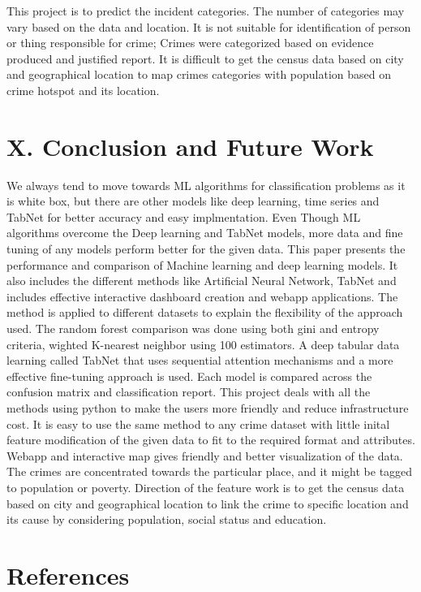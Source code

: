 \documentclass[10 pt,conference,final,]{IEEEtran}
\begin{document}
This project is to predict the incident categories. The number of
categories may vary based on the data and location. It is not suitable
for identification of person or thing responsible for crime; Crimes were
categorized based on evidence produced and justified report. It is
difficult to get the census data based on city and geographical location
to map crimes categories with population based on crime hotspot and its
location.

\section{X. Conclusion and Future
Work}\label{x.-conclusion-and-future-work}

We always tend to move towards ML algorithms for classification problems
as it is white box, but there are other models like deep learning, time
series and TabNet for better accuracy and easy implmentation. Even
Though ML algorithms overcome the Deep learning and TabNet models, more
data and fine tuning of any models perform better for the given data.
This paper presents the performance and comparison of Machine learning
and deep learning models. It also includes the different methods like
Artificial Neural Network, TabNet and includes effective interactive
dashboard creation and webapp applications. The method is applied to
different datasets to explain the flexibility of the approach used. The
random forest comparison was done using both gini and entropy criteria,
wighted K-nearest neighbor using 100 estimators. A deep tabular data
learning called TabNet that uses sequential attention mechanisms and a
more effective fine-tuning approach is used. Each model is compared
across the confusion matrix and classification report. This project
deals with all the methods using python to make the users more friendly
and reduce infrastructure cost. It is easy to use the same method to any
crime dataset with little inital feature modification of the given data
to fit to the required format and attributes. Webapp and interactive map
gives friendly and better visualization of the data. The crimes are
concentrated towards the particular place, and it might be tagged to
population or poverty. Direction of the feature work is to get the
census data based on city and geographical location to link the crime to
specific location and its cause by considering population, social status
and education.

\section*{References}\label{references}
\end{document}
